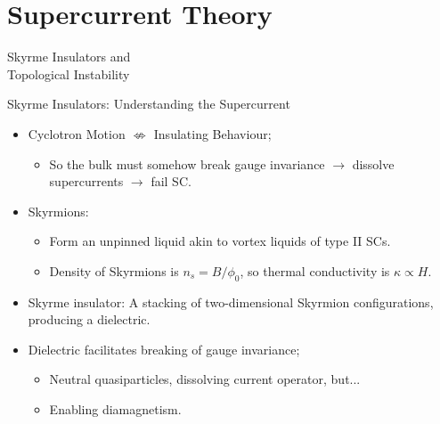 \documentclass{beamer}
\begin{document}
\section{Supercurrent Theory}

\begin{frame}
    
    \centering Skyrme Insulators and \\
    \centering Topological Instability
\end{frame}




\begin{frame}{Skyrme Insulators: Understanding the Supercurrent}
    
    \begin{itemize}
        \item Cyclotron Motion $ \not \Leftrightarrow $ Insulating Behaviour;
        \begin{itemize}
            \item So the bulk must somehow break gauge invariance $\to$ dissolve supercurrents $\to$ fail SC.
            
        \end{itemize}
        
        \item Skyrmions:
        \begin{itemize}
            \item Form an unpinned liquid akin to vortex liquids of type II SCs.
            
            \item Density of Skyrmions is $n_s = B/ \phi_0$, so thermal conductivity is $\kappa \propto H$.
        \end{itemize}
        
        \item Skyrme insulator: A stacking of two-dimensional Skyrmion configurations, producing a dielectric.
        
        \item Dielectric facilitates breaking of gauge invariance;
        
        \begin{itemize}
            \item Neutral quasiparticles, dissolving current operator, but...
            \item Enabling diamagnetism.
        \end{itemize}
    \end{itemize}
    
    
    
\end{frame}
\end{document}
